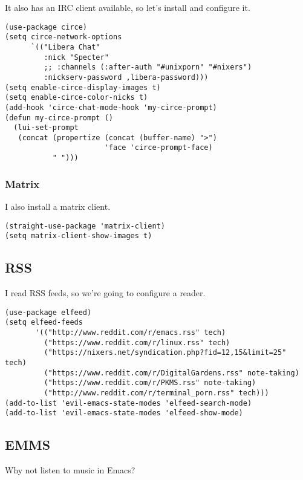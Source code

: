 \documentclass[11pt]{article}
\begin{document}
It also has an IRC client available, so let's install and configure it.

\begin{verbatim}
(use-package circe)
(setq circe-network-options
      `(("Libera Chat"
         :nick "Specter"
         ;; :channels (:after-auth "#unixporn" "#nixers")
         :nickserv-password ,libera-password)))
(setq enable-circe-display-images t)
(setq enable-circe-color-nicks t)
(add-hook 'circe-chat-mode-hook 'my-circe-prompt)
(defun my-circe-prompt ()
  (lui-set-prompt
   (concat (propertize (concat (buffer-name) ">")
                       'face 'circe-prompt-face)
           " ")))
\end{verbatim}

\subsubsection*{Matrix}
\label{sec:orge10393a}

I also install a matrix client.

\begin{verbatim}
(straight-use-package 'matrix-client)
(setq matrix-client-show-images t)
\end{verbatim}

\subsection*{RSS}
\label{sec:orgfae8ae2}

I read RSS feeds, so we're going to configure a reader.

\begin{verbatim}
(use-package elfeed)
(setq elfeed-feeds
       '(("http://www.reddit.com/r/emacs.rss" tech)
         ("https://www.reddit.com/r/linux.rss" tech)
         ("https://nixers.net/syndication.php?fid=12,15&limit=25" tech)
         ("https://www.reddit.com/r/DigitalGardens.rss" note-taking)
         ("https://www.reddit.com/r/PKMS.rss" note-taking)
         ("http://www.reddit.com/r/terminal_porn.rss" tech)))
(add-to-list 'evil-emacs-state-modes 'elfeed-search-mode)
(add-to-list 'evil-emacs-state-modes 'elfeed-show-mode)
\end{verbatim}

\subsection*{EMMS}
\label{sec:orgba4c2c1}

Why not listen to music in Emacs?
\end{document}
